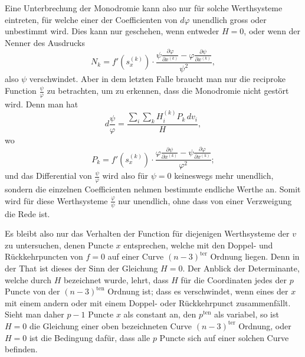 \documentclass[10pt]{article}
\begin{document}
Eine Unterbrechung der Monodromie kann also nur für solche Werthsysteme eintreten, für welche einer der Coefficienten von \(d\varphi\) unendlich gross oder unbestimmt wird. Dies kann nur geschehen, wenn entweder \(H=0\), oder wenn der Nenner des Ausdrucks
\[
N_k=f'(s_x^{(k)})\cdot\frac{\psi\frac{\partial\varphi}{\partial x^{(k)}}-\varphi\frac{\partial\psi}{\partial x^{(k)}}}{\psi^2},
\]
also \(\psi\) verschwindet. Aber in dem letzten Falle braucht man nur die reciproke Function \(\frac{\psi}{\varphi}\) zu betrachten, um zu erkennen, dass die Monodromie nicht gestört wird. Denn man hat
\[
d\frac{\psi}{\varphi}=\frac{\sum_i\sum_k H_i^{(k)}P_k\,dv_i}{H},
\]
wo
\[
P_k=f'(s_x^{(k)})\cdot\frac{\varphi\frac{\partial\psi}{\partial x^{(k)}}-\psi\frac{\partial\varphi}{\partial x^{(k)}}}{\varphi^2};
\]
und das Differential von \(\frac{\psi}{\varphi}\) wird also für \(\psi=0\) keineswegs mehr unendlich, sondern die einzelnen Coefficienten nehmen bestimmte endliche Werthe an. Somit wird für diese Werthsysteme \(\frac{\varphi}{\psi}\) nur unendlich, ohne dass von einer Verzweigung die Rede ist.

Es bleibt also nur das Verhalten der Function für diejenigen Werthsysteme der \(v\) zu untersuchen, denen Puncte \(x\) entsprechen, welche mit den Doppel- und Rückkehrpuncten von \(f=0\) auf einer Curve \((n-3)^{\mathrm{ter}}\) Ordnung liegen. Denn in der That ist dieses der Sinn der Gleichung \(H=0\). Der Anblick der Determinante, welche durch \(H\) bezeichnet wurde, lehrt, dass \(H\) für die Coordinaten jedes der \(p\) Puncte von der \((n-3)^{\mathrm{ten}}\) Ordnung ist; dass es verschwindet, wenn eines der \(x\) mit einem andern oder mit einem Doppel- oder Rückkehrpunct zusammenfällt. Sieht man daher \(p-1\) Puncte \(x\) als constant an, den \(p^{\mathrm{ten}}\) als variabel, so ist \(H=0\) die Gleichung einer oben bezeichneten Curve \((n-3)^{\mathrm{ter}}\) Ordnung, oder \(H=0\) ist die Bedingung dafür, dass alle \(p\) Puncte sich auf einer solchen Curve befinden.
\end{document}
